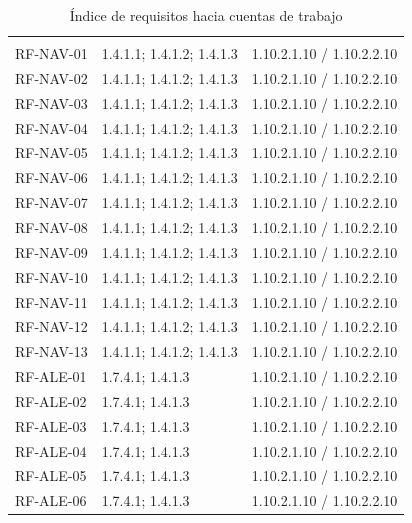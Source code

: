 \begin{longtable}{L{23mm}L{46mm}L{72mm}}
\caption{Índice de requisitos hacia cuentas de trabajo}\label{tab:sd7-trazabilidad-total}\\\hline
  &  & \\\hline\endfirsthead
\hline {} &  & \\\hline\endhead
RF-NAV-01 & 1.4.1.1; 1.4.1.2; 1.4.1.3 & 1.10.2.1.10 / 1.10.2.2.10\\\hline
RF-NAV-02 & 1.4.1.1; 1.4.1.2; 1.4.1.3 & 1.10.2.1.10 / 1.10.2.2.10\\\hline
RF-NAV-03 & 1.4.1.1; 1.4.1.2; 1.4.1.3 & 1.10.2.1.10 / 1.10.2.2.10\\\hline
RF-NAV-04 & 1.4.1.1; 1.4.1.2; 1.4.1.3 & 1.10.2.1.10 / 1.10.2.2.10\\\hline
RF-NAV-05 & 1.4.1.1; 1.4.1.2; 1.4.1.3 & 1.10.2.1.10 / 1.10.2.2.10\\\hline
RF-NAV-06 & 1.4.1.1; 1.4.1.2; 1.4.1.3 & 1.10.2.1.10 / 1.10.2.2.10\\\hline
RF-NAV-07 & 1.4.1.1; 1.4.1.2; 1.4.1.3 & 1.10.2.1.10 / 1.10.2.2.10\\\hline
RF-NAV-08 & 1.4.1.1; 1.4.1.2; 1.4.1.3 & 1.10.2.1.10 / 1.10.2.2.10\\\hline
RF-NAV-09 & 1.4.1.1; 1.4.1.2; 1.4.1.3 & 1.10.2.1.10 / 1.10.2.2.10\\\hline
RF-NAV-10 & 1.4.1.1; 1.4.1.2; 1.4.1.3 & 1.10.2.1.10 / 1.10.2.2.10\\\hline
RF-NAV-11 & 1.4.1.1; 1.4.1.2; 1.4.1.3 & 1.10.2.1.10 / 1.10.2.2.10\\\hline
RF-NAV-12 & 1.4.1.1; 1.4.1.2; 1.4.1.3 & 1.10.2.1.10 / 1.10.2.2.10\\\hline
RF-NAV-13 & 1.4.1.1; 1.4.1.2; 1.4.1.3 & 1.10.2.1.10 / 1.10.2.2.10\\\hline
RF-ALE-01 & 1.7.4.1; 1.4.1.3 & 1.10.2.1.10 / 1.10.2.2.10\\\hline
RF-ALE-02 & 1.7.4.1; 1.4.1.3 & 1.10.2.1.10 / 1.10.2.2.10\\\hline
RF-ALE-03 & 1.7.4.1; 1.4.1.3 & 1.10.2.1.10 / 1.10.2.2.10\\\hline
RF-ALE-04 & 1.7.4.1; 1.4.1.3 & 1.10.2.1.10 / 1.10.2.2.10\\\hline
RF-ALE-05 & 1.7.4.1; 1.4.1.3 & 1.10.2.1.10 / 1.10.2.2.10\\\hline
RF-ALE-06 & 1.7.4.1; 1.4.1.3 & 1.10.2.1.10 / 1.10.2.2.10\\\hline

\end{longtable}
